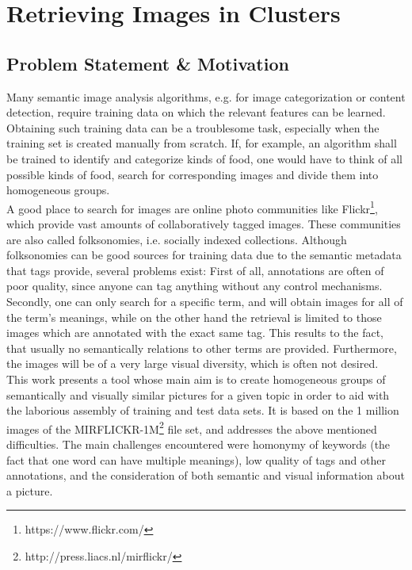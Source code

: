 \section{Retrieving Images in Clusters}
\label{sec_introduction}


\subsection{Problem Statement \& Motivation}
Many semantic image analysis algorithms, e.g. for image categorization or content detection, require training data on which the relevant features can be learned. Obtaining such training data can be a troublesome task, especially when the training set is created manually from scratch. If, for example, an algorithm shall be trained to identify and categorize kinds of food, one would have to think of all possible kinds of food, search for corresponding images and divide them into homogeneous groups. \\
A good place to search for images are online photo communities like Flickr\footnote{https://www.flickr.com/}, which provide vast amounts of collaboratively tagged images. These communities are also called folksonomies, i.e. socially indexed collections.
Although folksonomies can be good sources for training data due to the semantic metadata that tags provide, several problems exist: First of all, annotations are often of poor quality, since anyone can tag anything without any control mechanisms. Secondly, one can only search for a specific term, and will obtain images for all of the term's meanings, while on the other hand the retrieval is limited to those images which are annotated with the exact same tag. This results to the fact, that usually no semantically relations to other terms are provided. Furthermore, the images will be of a very large visual diversity, which is often not desired. \\

This work presents a tool whose main aim is to create homogeneous groups of semantically and visually similar pictures for a given topic in order to aid with the laborious assembly of training and test data sets. It is based on the 1 million images of the MIRFLICKR-1M\footnote{http://press.liacs.nl/mirflickr/} file set, and addresses the above mentioned difficulties. The main challenges encountered were homonymy of keywords (the fact that one word can have multiple meanings), low quality of tags and other annotations, and the consideration of both semantic and visual information about a picture.

